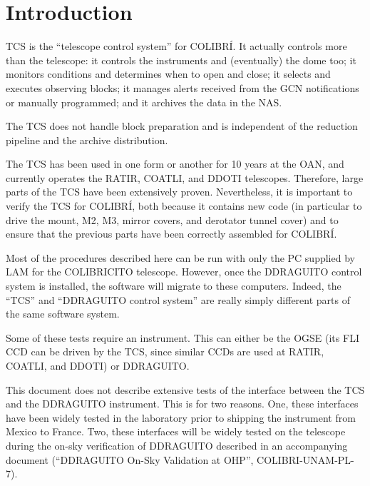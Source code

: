 \documentclass{article}
\begin{document}
\clearpage

\pagestyle{plain}

\setcounter{tocdepth}{2}
\tableofcontents
\newpage




\section{Introduction}

TCS is the “telescope control system” for COLIBRÍ. It actually controls more than the telescope: it controls the instruments and (eventually) the dome too; it monitors conditions and determines when to open and close; it selects and executes observing blocks; it manages alerts received from the GCN notifications or manually programmed; and it archives the data in the NAS.

The TCS does not handle block preparation and is independent of the reduction pipeline and the archive distribution.

The TCS has been used in one form or another for 10 years at the OAN, and currently operates the RATIR, COATLI, and DDOTI telescopes. Therefore, large parts of the TCS have been extensively proven. Nevertheless, it is important to verify the TCS for COLIBRÍ, both because it contains new code (in particular to drive the mount, M2, M3, mirror covers, and derotator tunnel cover) and to ensure that the previous parts have been correctly assembled for COLIBRÍ.

Most of the procedures described here can be run with only the PC supplied by LAM for the COLIBRICITO telescope. However, once the DDRAGUITO control system is installed, the software will migrate to these computers. Indeed, the “TCS” and “DDRAGUITO control system” are really simply different parts of the same software system.

Some of these tests require an instrument. This can either be the OGSE (its FLI CCD can be driven by the TCS, since similar CCDs are used at RATIR, COATLI, and DDOTI) or DDRAGUITO.

This document does not describe extensive tests of the interface between the TCS and the DDRAGUITO instrument. This is for two reasons. One, these interfaces have been widely tested in the laboratory prior to shipping the instrument from Mexico to France. Two, these interfaces will be widely tested on the telescope during the on-sky verification of DDRAGUITO described in an accompanying document (“DDRAGUITO On-Sky Validation at OHP”, COLIBRI-UNAM-PL-7).
\end{document}
